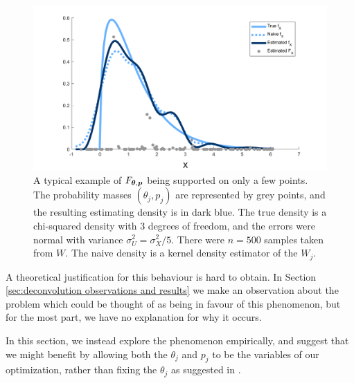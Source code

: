 	\begin{figure}
		\centering
		\includegraphics[width = \textwidth]{Figures/Deconvolution/fixed_masses_example.png}
		\caption[A typical example of $F_{\vect{\theta}, \vect{p}}$ being supported on only a few points]{A typical example of $F_{\vect{\theta}, \vect{p}}$ being supported on only a few points. The probability masses $(\theta_j, p_j)$ are represented by grey points, and the resulting estimating density is in dark blue. The true density is a chi-squared density with 3 degrees of freedom, and the errors were normal with variance $\sigma_U^2 = \sigma_X^2 / 5$. There were $n = 500$ samples taken from $W$. The naive density is a kernel density estimator of the $W_j$.}
		\label{fig:fixed masses example alone}
	\end{figure}


	A theoretical justification for this behaviour is hard to obtain. In Section \ref{sec:deconvolution observations and results} we make an observation about the problem which could be thought of as being in favour of this phenomenon, but for the most part, we have no explanation for why it occurs.

	In this section, we instead explore the phenomenon empirically, and suggest that we might benefit by allowing both the $\theta_j$ and $p_j$ to be the variables of our optimization, rather than fixing the $\theta_j$ as suggested in \cite{Delaigle2016-la}.

